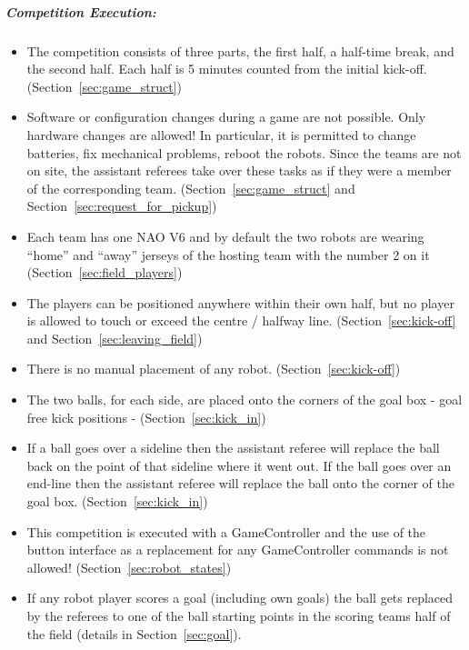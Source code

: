 \subparagraph{Competition Execution:}
\begin{itemize}
	\item The competition consists of three parts, the first half, a half-time break, and the second half. Each half is 5 minutes counted from the initial kick-off. (\cf Section~\ref{sec:game_struct})
	
	\item Software or configuration changes during a game are not possible. Only hardware changes are allowed! In particular, it is permitted to change batteries, fix mechanical problems, reboot the robots. Since the teams are not on site, the assistant referees take over these tasks as if they were a member of the corresponding team. (\cf Section~\ref{sec:game_struct} and Section~\ref{sec:request_for_pickup})
	
	\item Each team has one NAO V6 and by default the two robots are wearing ``home'' and ``away'' jerseys of the hosting team with the number 2 on it (\cf Section~\ref{sec:field_players})
	
	\item The players can be positioned anywhere within their own half, but no player is allowed to touch or exceed the centre / halfway line. (\cf Section~\ref{sec:kick-off} and Section~\ref{sec:leaving_field})
	
	\item There is no manual placement of any robot. (\cf Section~\ref{sec:kick-off})
	
	\item The two balls, for each side, are placed onto the corners of the goal box - goal free kick positions - (\cf Section~\ref{sec:kick_in})
	
	\item If a ball goes over a sideline then the assistant referee will replace the ball back on the point of that sideline where it went out. If the ball goes over an end-line then the assistant referee will replace the ball onto the corner of the goal box. (\cf Section~\ref{sec:kick_in})
	
	\item This competition is executed with a GameController and the use of the button interface as a replacement for any GameController commands is not allowed! (\cf Section~\ref{sec:robot_states})
	
	\item If any robot player scores a goal (including own goals) the ball gets replaced by the referees to one of the ball starting points in the scoring teams half of the field (\cf details in Section~\ref{sec:goal}).
	

\end{itemize}
